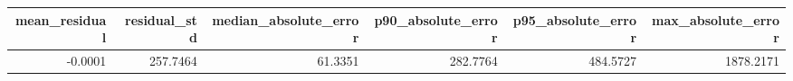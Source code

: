 \begin{tabular}{rrrrrr}
\toprule
mean_residual & residual_std & median_absolute_error & p90_absolute_error & p95_absolute_error & max_absolute_error \\
\midrule
-0.0001 & 257.7464 & 61.3351 & 282.7764 & 484.5727 & 1878.2171 \\
\bottomrule
\end{tabular}
